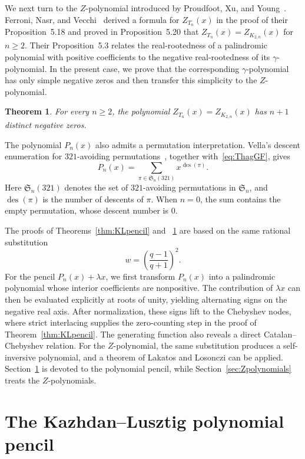 \documentclass[11pt]{article}
\theoremstyle{plain}
\newtheorem{theorem}{Theorem}[section]
\theoremstyle{remark}
\begin{document}
We next turn to the $Z$-polynomial introduced by Proudfoot, Xu, and
Young~\cite{ProudfootXuYoung}.  Ferroni, Nasr, and
Vecchi~\cite{FerroniNasrVecchiGamma} derived a formula for
$Z_{T_n}(x)$ in the proof of their Proposition~5.18 and proved in
Proposition~5.20 that $Z_{T_n}(x)=Z_{K_{2,n}}(x)$ for $n\ge2$.
Their Proposition~5.3 relates the real-rootedness of a palindromic
polynomial with positive coefficients to the negative real-rootedness
of its $\gamma$-polynomial.  In the present case, we prove that the
corresponding $\gamma$-polynomial has only simple negative zeros and
then transfer this simplicity to the $Z$-polynomial.

\begin{theorem}\label{thm:ZRealRooted}
For every $n\ge2$, the polynomial
$Z_{T_n}(x)=Z_{K_{2,n}}(x)$ has $n+1$ distinct negative zeros.
\end{theorem}

The polynomial $P_n(x)$ also admits a permutation interpretation.
Vella's descent enumeration for $321$-avoiding
permutations~\cite{Vella}, together with~\eqref{eq:ThagGF}, gives
\[
P_n(x)=\sum_{\pi\in\mathfrak S_n(321)}
       x^{\operatorname{des}(\pi)}.
\]
Here $\mathfrak S_n(321)$ denotes the set of $321$-avoiding
permutations in $\mathfrak S_n$, and $\operatorname{des}(\pi)$ is the
number of descents of $\pi$.  When $n=0$, the sum contains the empty
permutation, whose descent number is $0$.

The proofs of Theorems~\ref{thm:KLpencil} and~
\ref{thm:ZRealRooted} are based on the same rational substitution
\[
w=\left(\frac{q-1}{q+1}\right)^2.
\]
For the pencil $P_n(x)+\lambda x$, we first transform $P_n(x)$
into a palindromic polynomial whose interior coefficients are
nonpositive.  The contribution of $\lambda x$ can then be evaluated
explicitly at roots of unity, yielding alternating signs on the
negative real axis.  After normalization, these signs lift to the
Chebyshev nodes, where strict interlacing supplies the zero-counting
step in the proof of Theorem~\ref{thm:KLpencil}.  The generating
function also reveals a direct Catalan--Chebyshev relation.
For the $Z$-polynomial, the same substitution produces a
self-inversive polynomial, and a theorem of Lakatos and Losonczi can
be applied.  Section~\ref{sec:KLproof} is devoted to the polynomial
pencil, while Section~\ref{sec:Zpolynomials} treats the
$Z$-polynomials.

\section{The Kazhdan--Lusztig polynomial pencil}\label{sec:KLproof}
\end{document}
